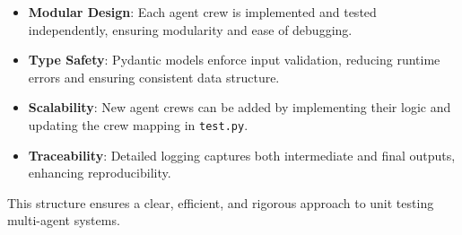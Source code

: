 \begin{itemize}
    \item \textbf{Modular Design}: Each agent crew is implemented and tested independently, ensuring modularity and ease of debugging.
    \item \textbf{Type Safety}: Pydantic models enforce input validation, reducing runtime errors and ensuring consistent data structure.
    \item \textbf{Scalability}: New agent crews can be added by implementing their logic and updating the crew mapping in \texttt{test.py}.
    \item \textbf{Traceability}: Detailed logging captures both intermediate and final outputs, enhancing reproducibility.
\end{itemize}

This structure ensures a clear, efficient, and rigorous approach to unit testing multi-agent systems.
